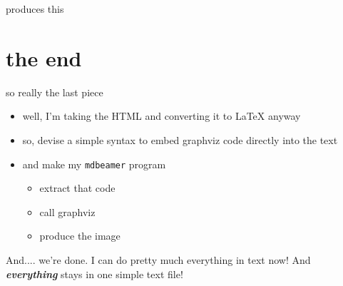 \documentclass{beamer}
\begin{document}
\begin{frame}{produces this}




\end{frame}

\section{the end}

\begin{frame}{so really the last piece}

\begin{itemize}
\item
well, I'm taking the HTML and converting it to LaTeX anyway
\item
so, devise a simple syntax to embed graphviz code directly into the text
\item
and make my \texttt{mdbeamer} program
\begin{itemize}
\item
extract that code
\item
call graphviz
\item
produce the image
\end{itemize}
\end{itemize}

And.... we're done.  I can do pretty much everything in text now!  And
\textbf{\textit{everything}} stays in one simple text file!

\end{frame}
\end{document}
